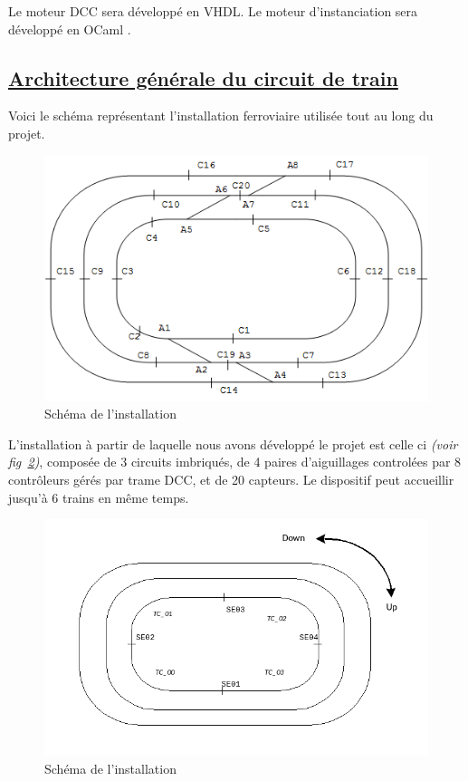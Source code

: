 Le moteur DCC sera développé en VHDL. Le moteur d'instanciation sera
développé en OCaml \cite{OCAML}.


\newpage
\subsection{\underline{Architecture g\'en\'erale du circuit de train}}
\label{sec:archi}

Voici le sch\'ema repr\'esentant l'installation ferroviaire utilis\'ee
tout au long du projet. 

\begin{figure}[h]
\centering
\includegraphics[scale=0.55]{circuit.png}
\caption{Sch\'ema de l'installation}
\label{fig4}
\end{figure}

L'installation à partir de laquelle nous avons développé le projet est
celle ci \emph{(voir fig~\ref{fig4})}, compos\'ee de 3
circuits imbriqués, de 4 paires d'aiguillages control\'ees par 8
contr\^oleurs gérés par trame DCC, et de 20 capteurs.
Le dispositif peut accueillir jusqu'\`a 6 trains en m\^eme temps.

\begin{figure}[h]
\centering
\includegraphics[scale=0.55]{circuit_vrai.png}
\caption{Sch\'ema de l'installation}
\label{fig4}
\end{figure}

